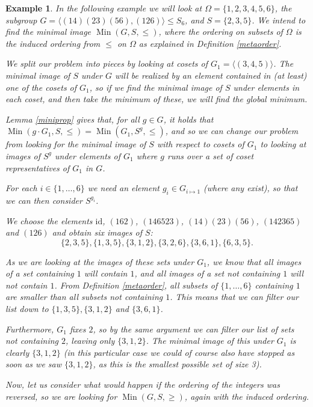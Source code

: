 \documentclass[preprint,12pt]{elsarticle}
\newtheorem{ex}[theorem]{Example}
\newcommand{\SX}[1]{\ensuremath{S_{#1}}\xspace}
\newcommand{\id}{\textrm{id}}
\newcommand{\Min}{\operatorname{Min}}
\begin{document}
\begin{ex}\label{ex:minimal}
  In the following example we will look at $\Omega = \{1,2,3,4,5,6\}$,
  the subgroup {$G = \langle (14)(23)(56), (126)\rangle \leq \SX{6}$},
  and $S = \{2,3,5\}$.
  We intend to find the minimal image $\Min(G,S, \leq)$, where the ordering on
  subsets of $\Omega$ is the induced ordering from $\leq$ on $\Omega$ as explained in
  Definition \ref{metaorder}.

  We split our problem into pieces by looking at cosets of \(G_1 = \langle (3,4,5)
  \rangle\). The minimal image of \(S\) under \(G\) will be realized by an
  element contained in (at least) one of the cosets of \(G_1\), so if we find
  the minimal image of \(S\) under elements in each coset, and then take the
  minimum of these, we will find the global minimum.

  Lemma \ref{miniprop} gives that, for all $g \in G$, it holds that $\Min(g \cdot
  G_1, S, \leq) = \Min(G_1, S^g, \leq)$, and
  so we can change our problem from looking for the minimal image of $S$ with
  respect to cosets of \(G_1\) to looking at images of \(S^g\) under elements of
  $G_1$ where $g$ runs over a set of coset representatives of $G_1$ in $G$.

  For each $i \in \{1,\dots,6\}$ we need an element
  $g_i \in G_{i \mapsto 1}$ (where any exist), so that we can then consider $S^{g_i}$.

  We choose the elements $\id$, $(162)$, $(146523)$, $(14)(23)(56)$, $(142365)$
  and $(126)$ and obtain six images of $S$:
  \[
    \{2,3,5\}, \{1,3,5\}, \{3,1,2\}, \{3,2,6\}, \{3,6,1\}, \{6,3,5\}.
  \]

  As we are looking at the images of these sets under \(G_1\), we
  know that all images of a set containing \(1\) will contain \(1\),
  and all images of a set not containing \(1\) will not contain \(1\).
  From Definition \ref{metaorder}, all subsets of \(\{1,\dots,6\}\)
  containing \(1\) are smaller than all subsets not containing \(1\). This means
  that we can filter our list down to $\{1,3,5\}, \{3,1,2\}$ and $\{3,6,1\}$.

  Furthermore, \(G_1\) fixes \(2\), so by the same argument we can filter our
  list of sets not containing \(2\), leaving only \(\{3,1,2\}\). The minimal image
  of this under \(G_1\) is clearly \(\{3,1,2\}\) (in this particular
  case we could of course also have stopped as soon as we saw \(\{3,1,2\}\), as
  this is the smallest possible set of size 3).

  Now, let us consider what would happen if the ordering of the integers was
  reversed, so we are looking for \(\Min(G, S, \geq)\), again with the
  induced ordering.


\end{ex}
\end{document}
